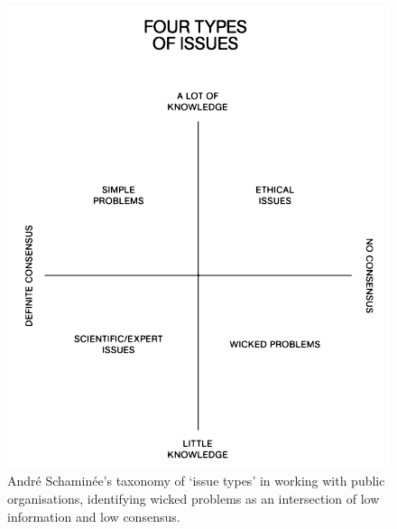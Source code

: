 \documentclass[nofonts,nols,justified,nobib]{tufte-book}
\begin{document}
\begin{figure}
\includegraphics[width=\textwidth]{img/1/problem-types.png}
\caption{Andr\'e Schamin\'ee's taxonomy of `issue types' in working with public organisations, identifying wicked problems as an intersection of low information and low consensus. \cite{schaminee_designing_2018}}
\end{figure}
\end{document}
